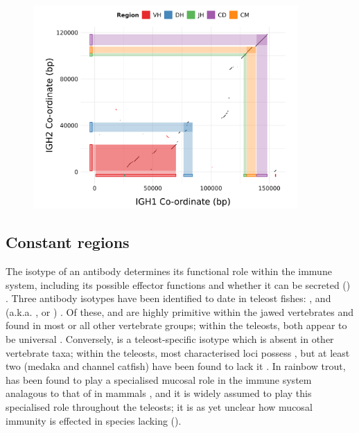 \begin{figure}
	\centering
	\includegraphics[width=0.9\textwidth]{_Figures/png/nfu-locus-dots}
	\label{fig:nfu-locus-synteny}
\end{figure}
	
	\subsection{Constant regions}
	\label{sec:nfu-locus-constant}


	
	The isotype of an antibody determines its functional role within the immune system, including its possible effector functions and whether it can be secreted () \parencite{schroeder2010immunoglobulins}. Three antibody isotypes have been identified to date in teleost fishes: ,  and  (a.k.a. ,  or ) \parencite{fillatreau2013astonishing,bengten2015fishantibodies,magadan2015fishrepertoires}. Of these,  and  are highly primitive within the jawed vertebrates and found in most or all other vertebrate groups; within the teleosts, both appear to be universal \parencite{bengten2015fishantibodies}. Conversely,  is a teleost-specific isotype which is absent in other vertebrate taxa; within the teleosts, most characterised \igh{} loci possess , but at least two (medaka and channel catfish) have been found to lack it \parencite{fillatreau2013astonishing,bengten2015fishantibodies}. In rainbow trout,  has been found to play a specialised mucosal role in the immune system analagous to that of  in mammals \parencite{zhang2010igtgut,xu2013igtskin}, and it is widely assumed to play this specialised role throughout the teleosts; it is as yet unclear how mucosal immunity is effected in species lacking  ().

